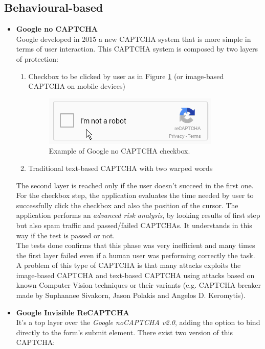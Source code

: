 \subsection{Behavioural-based}
\begin{itemize}
\item{\textbf{Google no CAPTCHA}\\
Google developed in 2015 a new CAPTCHA system that is more simple in terms of user interaction\cite{Google}. This CAPTCHA system is composed by two layers of protection:
\begin{enumerate}
\item{Checkbox to be clicked by user as in Figure \ref{soa:noCAPTCHA} (or image-based CAPTCHA on mobile devices)
\begin{figure}[h]
     \centering
     \includegraphics[width=.55\linewidth]{Images/StateOfArt/noCAPTCHA}
     \caption{\footnotesize{Example of Google no CAPTCHA checkbox.}}\label{soa:noCAPTCHA}
\end{figure}
}
\item{Traditional text-based CAPTCHA with two warped words}
\end{enumerate}
The second layer is reached only if the user doesn't succeed in the first one. For the checkbox step, the application evaluates the time needed by user to successfully click the checkbox and also the position of the cursor. The application performs an \textit{advanced risk analysis}, by looking results of first step but also spam traffic and passed/failed CAPTCHAs. It understands in this way if the test is passed or not.\\
The tests done confirms that this phase was very inefficient and many times the first layer failed even if a human user was performing correctly the task. A problem of this type of CAPTCHA is that many attacks exploits the image-based CAPTCHA and text-based CAPTCHA using attacks based on known Computer Vision techniques or their variants (e.g. CAPTCHA breaker made by Suphannee Sivakorn, Jason Polakis and Angelos D. Keromytis\cite{break_Google}).
}
\item{\textbf{Google Invisible ReCAPTCHA}\\
It's a top layer over the \textit{Google noCAPTCHA v2.0}, adding the option to bind directly to the form's submit element\cite{google}. There exist two version of this CAPTCHA:
}
\end{itemize}
